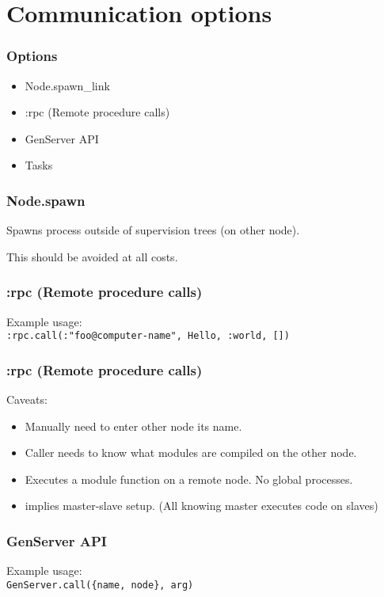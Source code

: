 \section{Communication options}

\frame{\tableofcontents[currentsection]}

\begin{frame}
    \frametitle{Options}
    \begin{itemize}
        \item Node.spawn\_link
        \item :rpc (Remote procedure calls)
        \item GenServer API
        \item Tasks
    \end{itemize}
\end{frame}

\begin{frame}
    \frametitle{Node.spawn}
    Spawns process outside of supervision trees (on other node). 
    
    \vfill

    This should be avoided at all costs.
\end{frame}

\begin{frame}
    \frametitle{:rpc (Remote procedure calls)}
    Example usage: \\
    \texttt{:rpc.call(:"foo@computer-name", Hello, :world, [])}
    \vfill
\end{frame}

\begin{frame}
    \frametitle{:rpc (Remote procedure calls)}
    Caveats: 
    \begin{itemize}
        \item Manually need to enter other node its name.
        \item Caller needs to know what modules are compiled on the other node.
        \item Executes a module function on a remote node. No global processes.
        \item implies master-slave setup. (All knowing master executes code on slaves)
    \end{itemize}
\end{frame}

\begin{frame}
    \frametitle{GenServer API}
    Example usage: \\
    \texttt{GenServer.call(\{name, node\}, arg)}
    \vfill
\end{frame}

